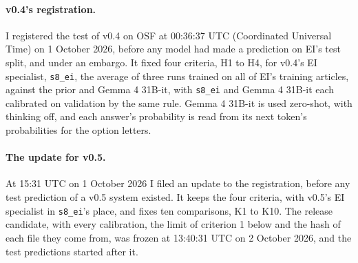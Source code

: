 \documentclass[11pt,letterpaper]{article}
\newcommand{\sysname}[1]{\texttt{#1}}
\begin{document}
\paragraph{v0.4's registration.} I registered the test of v0.4 on OSF \citep{osfreg} at 00:36:37 UTC (Coordinated Universal Time) on 1 October 2026, before any model had made a prediction on EI's test split, and under an embargo. It fixed four criteria, H1 to H4, for v0.4's EI specialist, \sysname{s8\_ei}, the average of three runs trained on all of EI's training articles, against the prior and Gemma 4 31B-it, with \sysname{s8\_ei} and Gemma 4 31B-it each calibrated on validation by the same rule. Gemma 4 31B-it is used zero-shot, with thinking off, and each answer's probability is read from its next token's probabilities for the option letters.

\paragraph{The update for v0.5.} At 15:31 UTC on 1 October 2026 I filed an update to the registration, before any test prediction of a v0.5 system existed. It keeps the four criteria, with v0.5's EI specialist in \sysname{s8\_ei}'s place, and fixes ten comparisons, K1 to K10. The release candidate, with every calibration, the limit of criterion 1 below and the hash of each file they come from, was frozen at 13:40:31 UTC on 2 October 2026, and the test predictions started after it.
\end{document}
